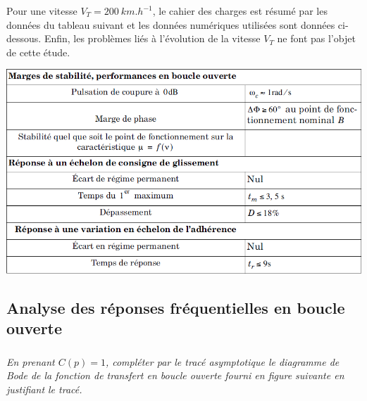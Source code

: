 \documentclass[10pt,fleqn]{article} %
\begin{document}
\begin{multicols}{2}
Pour une vitesse $V_T=\SI{200}{km.h^{-1}}$, le cahier des charges est résumé par les données 
du tableau suivant et les données numériques utilisées sont données ci-dessous.
Enfin, les problèmes liés à l’évolution de la vitesse $V_T$ ne font pas l’objet de cette
étude.


\begin{center}
\includegraphics[width=\linewidth]{images/fig_02}
\end{center}


\subsection*{Analyse des réponses fréquentielles en boucle ouverte}


\subparagraph{}
\textit{En prenant $C(p)=1$, compléter par le tracé asymptotique le diagramme
de Bode de la fonction de transfert en boucle ouverte fourni en figure suivante
en justifiant le tracé.}


\end{multicols}
\end{document}
